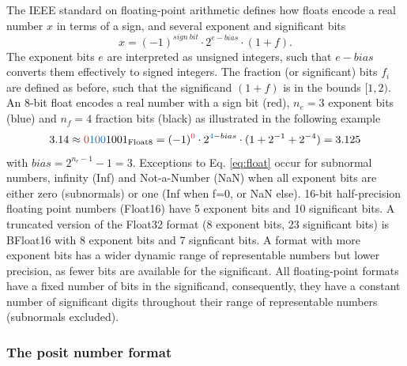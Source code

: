 \documentclass[draft]{agujournal2019}
\newcommand{\op}{\operatorname}
\begin{document}
The IEEE standard on floating-point arithmetic defines how floats encode a real number $x$ in terms of a sign, and several exponent and significant bits
\begin{equation}
x = (-1)^{sign~bit} \cdot 2^{e-bias} \cdot (1+f).
\label{eq:float}
\end{equation}
The exponent bits $e$ are interpreted as unsigned integers, such that $e-bias$ converts them effectively to signed integers. The fraction (or significant) bits $f_i$ are defined as before, such that the significand $(1+f)$ is in the bounds $[1,2)$. An 8-bit float encodes a real number with a sign bit (red), $n_e = 3$ exponent bits (blue) and $n_f=4$ fraction bits (black) as illustrated in the following example
\begin{equation}
3.14 \approx {\color{psign}0}{\color{pexpo}100}1001_{\op{Float8}} = (-1)^{\color{psign}0} \cdot 2^{{\color{pexpo}4}-bias} \cdot (1+2^{-1}+2^{-4}) = 3.125
\label{eq:posit_pos}
\end{equation}
with $bias=2^{n_e-1} - 1 = 3$. Exceptions to Eq. \ref{eq:float} occur for subnormal numbers, infinity (Inf) and Not-a-Number (NaN) when all exponent bits are either zero (subnormals) or one (Inf when f=0, or NaN else). 16-bit half-precision floating point numbers (Float16) have 5 exponent bits and 10 significant bits. A truncated version of the Float32 format (8 exponent bits, 23 significant bits) is BFloat16 with 8 exponent bits and 7 signficant bits. A format with more exponent bits has a wider dynamic range of representable numbers but lower precision, as fewer bits are available for the significant. All floating-point formats have a fixed number of bits in the significand, consequently, they have a constant number of significant digits throughout their range of representable numbers (subnormals excluded).

\subsubsection{The posit number format}
\label{sec:posit_methods}
\end{document}
